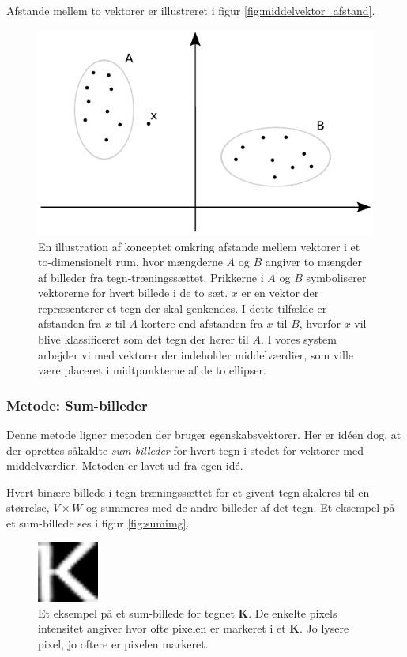 Afstande mellem to vektorer er illustreret i figur \vref{fig:middelvektor_afstand}.

\begin{figure}[htp]
\centering
\includegraphics{system/illu/middelvektor_afstand.pdf} 
\caption{En illustration af konceptet omkring afstande mellem vektorer i et to-dimensionelt rum, hvor mængderne $A$ og $B$ angiver to mængder af billeder fra tegn-træningssættet. Prikkerne i $A$ og $B$ symboliserer vektorerne for hvert billede i de to sæt. $x$ er en vektor der repræsenterer et tegn der skal genkendes. I dette tilfælde er afstanden fra $x$ til $A$ kortere end afstanden fra $x$ til $B$, hvorfor $x$ vil blive klassificeret som det tegn der hører til $A$. I vores system arbejder vi med vektorer der indeholder middelværdier, som ville være placeret i midtpunkterne af de to ellipser.}
\label{fig:middelvektor_afstand}
\end{figure}

\subsubsection*{Metode: Sum-billeder}

Denne metode ligner metoden der bruger egenskabsvektorer. Her er idéen dog, at der oprettes såkaldte \textit{sum-billeder} for hvert tegn i stedet for vektorer med middelværdier. Metoden er lavet ud fra egen idé.

Hvert binære billede i tegn-træningssættet for et givent tegn skaleres til en størrelse, $V \times W$ og summeres med de andre billeder af det tegn. Et eksempel på et sum-billede ses i figur \vref{fig:sumimg}.

\begin{figure}[htp]
\centering
\includegraphics[width=2cm]{system/illu/sumimg.png} 
\caption{Et eksempel på et sum-billede for tegnet \textbf{K}. De enkelte pixels intensitet angiver hvor ofte pixelen er markeret i et \textbf{K}. Jo lysere pixel, jo oftere er pixelen markeret.}
\label{fig:sumimg}
\end{figure}

